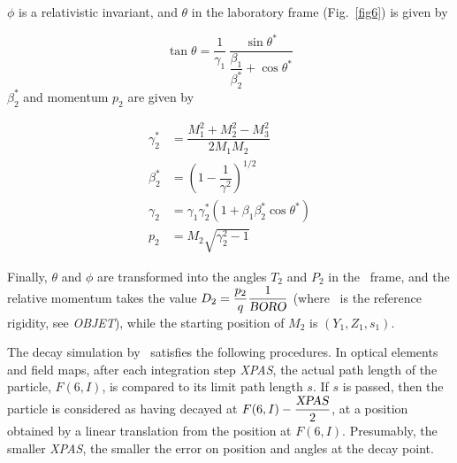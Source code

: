 \smallskip


\noindent $\phi$ is a relativistic invariant, and $\theta$ in the laboratory
frame (Fig.~\ref{fig6}) is given by    

$$ \tan \theta = \dfrac{1 }{ \gamma_1}\, 
    \dfrac{ \sin \theta^ \ast }{\dfrac{\beta_1 }{ \beta^ \ast_ 2}+ \cos \theta^\ast} 
    $$
%
  $ \beta^ \ast_ 2 $ and momentum $ p_2 $ are given by 

 \begin{align*}
	 \gamma^\ast_ 2 
	         & = \dfrac{M^2_1 + M^2_2 - M^2_3 }{ 2M_1M_2} \\
	\beta^\ast_ 2 
	         & =  \left( 1- \dfrac{1 }{ \gamma^ 2} \right)^{1/2} \\
	\gamma_2
	         & =   \gamma_1\gamma^ \ast_ 2 
	         	\left(1+\beta_1 \beta^\ast_ 2 \cos \theta^ \ast \right) \\
	p_2 
	         & = M_2 \sqrt{ \gamma^2_2 -1} 
 \end{align*}
 
\noindent Finally, $\theta$ and $\phi$ are transformed into the angles $ T_2 $
and $ P_2 $ in the \zgou\ frame, and the relative momentum takes the value 
$ D_2= \dfrac{p_2 }{ q} \dfrac{1}{\textsl{BORO}} $ (where \BORO\   
is the reference rigidity, see \textsl{OBJET}), while the starting position of 
$M_2 $ is $ (Y_1 , Z_1, s_1) $.   

\bigskip

\noindent The decay simulation by \zgou\  satisfies  the following procedures.
In optical elements and field maps, after each integration step \textsl{XPAS}, the actual 
path length of the particle, $ F(6,I) $, is compared to its limit path length $ s$. 
 If $s $ is passed, then the particle is considered as having decayed at 
 $ F(6,I) - \dfrac{\text{\textsl{XPAS}} }{ 2} $, 
at a position obtained by a linear translation from the position at $ F(6,I)$.
Presumably, the smaller \textsl{XPAS},  the smaller the error on position
and angles at the decay point.  

